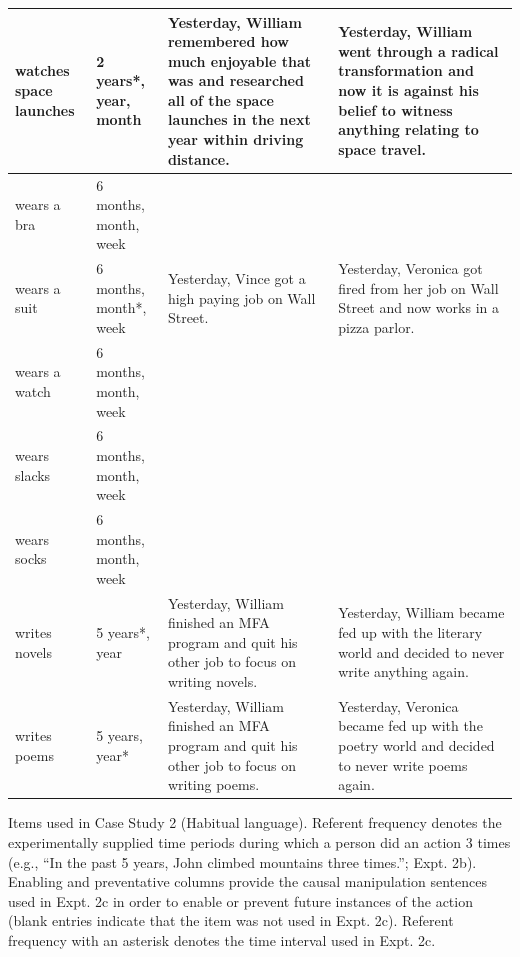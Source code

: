 \documentclass[english,,man,floatsintext]{apa6}
\theoremstyle{definition}
\theoremstyle{definition}
\theoremstyle{definition}
\theoremstyle{remark}
\begin{document}
\begin{longtable}{ |p{1in}|p{1.2in}| p{1.75in}|p{1.75in} |}
   \hline
watches space launches & 2 years*, year, month & Yesterday, William remembered how much enjoyable that was and researched all of the space launches in the next year within driving distance. & Yesterday, William went through a radical transformation and now it is against his belief to witness anything relating to space travel. \\ 
   \hline
wears a bra & 6 months, month, week &  &  \\ 
   \hline
wears a suit & 6 months, month*, week & Yesterday, Vince got a high paying job on Wall Street. & Yesterday, Veronica got fired from her job on Wall Street and now works in a pizza parlor. \\ 
   \hline
wears a watch & 6 months, month, week &  &  \\ 
   \hline
wears slacks & 6 months, month, week &  &  \\ 
   \hline
wears socks & 6 months, month, week &  &  \\ 
   \hline
writes novels & 5 years*, year & Yesterday, William finished an MFA program and quit his other job to focus on writing novels. & Yesterday, William became fed up with the literary world and decided to never write anything again. \\ 
   \hline
writes poems & 5 years, year* & Yesterday, William finished an MFA program and quit his other job to focus on writing poems. & Yesterday, Veronica became fed up with the poetry world and decided to never write poems again. \\ 
   \hline
\hline
\end{longtable}
\endgroup

Items used in Case Study 2 (Habitual language). Referent frequency
denotes the experimentally supplied time periods during which a person
did an action 3 times (e.g., \enquote{In the past 5 years, John climbed
mountains three times.}; Expt. 2b). Enabling and preventative columns
provide the causal manipulation sentences used in Expt. 2c in order to
enable or prevent future instances of the action (blank entries indicate
that the item was not used in Expt. 2c). Referent frequency with an
asterisk denotes the time interval used in Expt. 2c.
\end{document}
